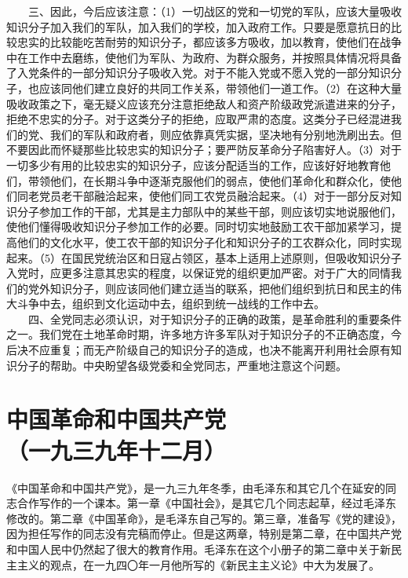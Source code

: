 \documentclass[cn,11pt,chinese]{elegantbook}
\def\myformat#1{\hfil\hfil #1}
\begin{document}
　　三、因此，今后应该注意：（1）一切战区的党和一切党的军队，应该大量吸收知识分子加入我们的军队，加入我们的学校，加入政府工作。只要是愿意抗日的比较忠实的比较能吃苦耐劳的知识分子，都应该多方吸收，加以教育，使他们在战争中在工作中去磨练，使他们为军队、为政府、为群众服务，并按照具体情况将具备了入党条件的一部分知识分子吸收入党。对于不能入党或不愿入党的一部分知识分子，也应该同他们建立良好的共同工作关系，带领他们一道工作。（2）在这种大量吸收政策之下，毫无疑义应该充分注意拒绝敌人和资产阶级政党派遣进来的分子，拒绝不忠实的分子。对于这类分子的拒绝，应取严肃的态度。这类分子已经混进我们的党、我们的军队和政府者，则应依靠真凭实据，坚决地有分别地洗刷出去。但不要因此而怀疑那些比较忠实的知识分子；要严防反革命分子陷害好人。（3）对于一切多少有用的比较忠实的知识分子，应该分配适当的工作，应该好好地教育他们，带领他们，在长期斗争中逐渐克服他们的弱点，使他们革命化和群众化，使他们同老党员老干部融洽起来，使他们同工农党员融洽起来。（4）对于一部分反对知识分子参加工作的干部，尤其是主力部队中的某些干部，则应该切实地说服他们，使他们懂得吸收知识分子参加工作的必要。同时切实地鼓励工农干部加紧学习，提高他们的文化水平，使工农干部的知识分子化和知识分子的工农群众化，同时实现起来。（5）在国民党统治区和日寇占领区，基本上适用上述原则，但吸收知识分子入党时，应更多注意其忠实的程度，以保证党的组织更加严密。对于广大的同情我们的党外知识分子，则应该同他们建立适当的联系，把他们组织到抗日和民主的伟大斗争中去，组织到文化运动中去，组织到统一战线的工作中去。\\
　　四、全党同志必须认识，对于知识分子的正确的政策，是革命胜利的重要条件之一。我们党在土地革命时期，许多地方许多军队对于知识分子的不正确态度，今后决不应重复；而无产阶级自己的知识分子的造成，也决不能离开利用社会原有知识分子的帮助。中央盼望各级党委和全党同志，严重地注意这个问题。\\
\newpage\section*{\myformat{中国革命和中国共产党}\\\myformat{（一九三九年十二月）}}
\begin{introduction}\item
《中国革命和中国共产党》，是一九三九年冬季，由毛泽东和其它几个在延安的同志合作写作的一个课本。第一章《中国社会》，是其它几个同志起草，经过毛泽东修改的。第二章《中国革命》，是毛泽东自己写的。第三章，准备写《党的建设》，因为担任写作的同志没有完稿而停止。但是这两章，特别是第二章，在中国共产党和中国人民中仍然起了很大的教育作用。毛泽东在这个小册子的第二章中关于新民主主义的观点，在一九四〇年一月他所写的《新民主主义论》中大为发展了。\end{introduction}
\end{document}
